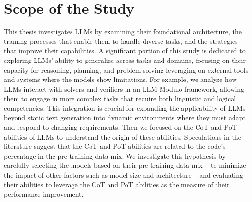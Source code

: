 \section*{Scope of the Study}
This thesis investigates LLMs by examining their foundational architecture, the training processes that enable them to handle diverse tasks, and the strategies that improve their capabilities.
A significant portion of this study is dedicated to exploring LLMs' ability to generalize across tasks and domains, focusing on their capacity for reasoning, planning, and problem-solving leveraging on external tools and systems where the models show limitations.
For example, we analyze how LLMs interact with solvers and verifiers in an LLM-Modulo framework, allowing them to engage in more complex tasks that require both linguistic and logical competencies.
This integration is crucial for expanding the applicability of LLMs beyond static text generation into dynamic environments where they must adapt and respond to changing requirements.
Then we focused on the CoT and PoT abilities of LLMs to understand the origin of these abilities.
Speculations in the literature suggest that the CoT and PoT abilities are related to the code's percentage in the pre-training data mix.
We investigate this hypothesis by carefully selecting the models based on their pre-training data mix -- to minimize the impact of other factors such as model size and architecture -- and evaluating their abilities to leverage the CoT and PoT abilities as the measure of their performance improvement.